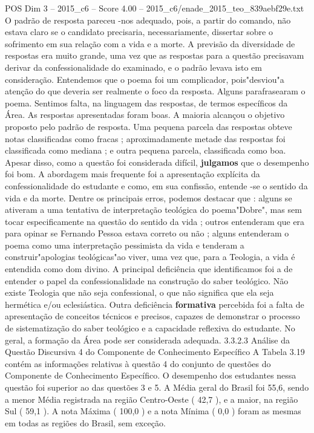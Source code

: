 \begin{textsample}{POS Dim 3 – 2015\_c6 – Score 4.00 – 2015\_c6/enade\_2015\_teo\_839aebf29e.txt}
O padrão de resposta pareceu -nos adequado, pois, a partir do comando, não estava claro se o candidato precisaria, necessariamente, dissertar sobre o sofrimento em sua relação com a vida e a morte.
A previsão da diversidade de respostas era muito grande, uma vez que as respostas para a questão precisavam derivar da confessionalidade do examinado, e o padrão levava isto em consideração.
Entendemos que o poema foi um complicador, pois"desviou"a atenção do que deveria ser realmente o foco da resposta.
Alguns parafrasearam o poema.
Sentimos falta, na linguagem das respostas, de termos específicos da Área.
As respostas apresentadas foram boas.
A maioria alcançou o objetivo proposto pelo padrão de resposta.
Uma pequena parcela das respostas obteve notas classificadas como fracas ; aproximadamente metade das respostas foi classificada como mediana ; e outra pequena parcela, classificada como boa.
Apesar disso, como a questão foi considerada difícil, \textbf{julgamos} que o desempenho foi bom.
A abordagem mais frequente foi a apresentação explícita da confessionalidade do estudante e como, em sua confissão, entende -se o sentido da vida e da morte.
Dentre os principais erros, podemos destacar que : alguns se ativeram a uma tentativa de interpretação teológica do poema"Dobre", mas sem tocar especificamente na questão do sentido da vida ; outros entenderam que era para opinar se Fernando Pessoa estava correto ou não ; alguns entenderam o poema como uma interpretação pessimista da vida e tenderam a construir"apologias teológicas"ao viver, uma vez que, para a Teologia, a vida é entendida como dom divino.
A principal deficiência que identificamos foi a de entender o papel da confessionalidade na construção do saber teológico.
Não existe Teologia que não seja confessional, o que não significa que ela seja hermética e/ou eclesiástica.
Outra deficiência \textbf{formativa} percebida foi a falta de apresentação de conceitos técnicos e precisos, capazes de demonstrar o processo de sistematização do saber teológico e a capacidade reflexiva do estudante.
No geral, a formação da Área pode ser considerada adequada. 3.3.2.3 Análise da Questão Discursiva 4 do Componente de Conhecimento Específico A Tabela 3.19 contém as informações relativas à questão 4 do conjunto de questões do Componente de Conhecimento Específico.
O desempenho dos estudantes nessa questão foi superior ao das questões 3 e 5.
A Média geral do Brasil foi 55,6, sendo a menor Média registrada na região Centro-Oeste ( 42,7 ), e a maior, na região Sul ( 59,1 ).
A nota Máxima ( 100,0 ) e a nota Mínima ( 0,0 ) foram as mesmas em todas as regiões do Brasil, sem exceção.

\end{textsample}
